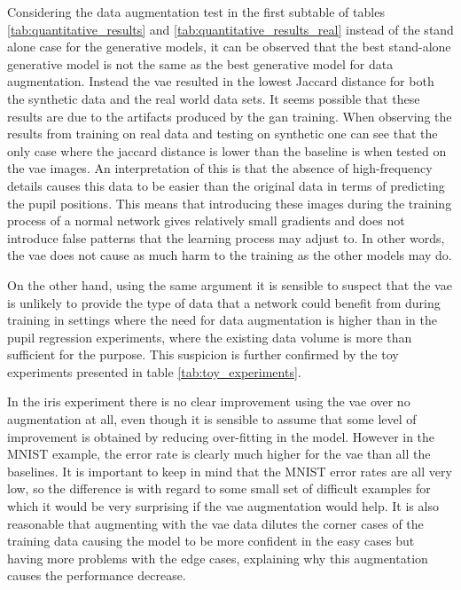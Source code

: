 Considering the data augmentation test in the first subtable of tables \ref{tab:quantitative_results} and \ref{tab:quantitative_results_real} instead of the stand alone case for the generative models, it can be observed that the best stand-alone generative model is not the same as the best generative model for data augmentation. Instead the \acrshort{vae} resulted in the lowest Jaccard distance for both the synthetic data and the real world data sets. It seems possible that these results are due to the artifacts produced by the \acrshort{gan} training. When observing the results from training on real data and testing on synthetic one can see that the only case where the jaccard distance is lower than the baseline is when tested on the \acrshort{vae} images. An interpretation of this is that the absence of high-frequency details causes this data to be easier than the original data in terms of predicting the pupil positions. This means that introducing these images during the training process of a normal network gives relatively small gradients and does not introduce false patterns that the learning process may adjust to. In other words, the \acrshort{vae} does not cause as much harm to the training as the other models may do. 

On the other hand, using the same argument it is sensible to suspect that the \acrshort{vae} is unlikely to provide the type of data that a network could benefit from during training in settings where the need for data augmentation is higher than in the pupil regression experiments, where the existing data volume is more than sufficient for the purpose. This suspicion is further confirmed by the toy experiments presented in table \ref{tab:toy_experiments}. 

In the iris experiment there is no clear improvement using the \acrshort{vae} over no augmentation at all, even though it is sensible to assume that some level of improvement is obtained by reducing over-fitting in the model. However in the MNIST example, the error rate is clearly much higher for the \acrshort{vae} than all the baselines. It is important to keep in mind that the MNIST error rates are all very low, so the difference is with regard to some small set of difficult examples for which it would be very surprising if the \acrshort{vae} augmentation would help. It is also reasonable that augmenting with the \acrshort{vae} data dilutes the corner cases of the training data causing the model to be more confident in the easy cases but having more problems with the edge cases, explaining why this augmentation causes the performance decrease.

